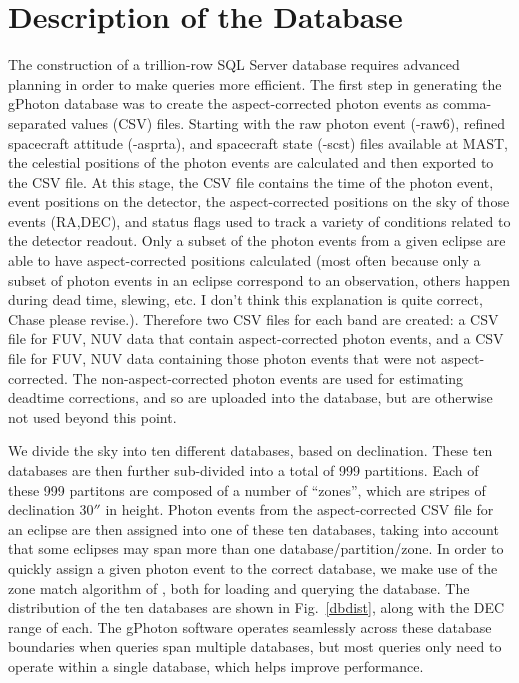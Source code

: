 \documentclass[preprint]{aastex}
\begin{document}
\section{Description of the Database}
\label{database}
The construction of a trillion-row SQL Server database requires advanced planning in order to make queries more efficient.  The first step in generating the gPhoton database was to create the aspect-corrected photon events as comma-separated values (CSV) files.  Starting with the raw photon event (-raw6), refined spacecraft attitude (-asprta), and spacecraft state (-scst) files available at MAST, the celestial positions of the photon events are calculated and then exported to the CSV file.  At this stage, the CSV file contains the time of the photon event, event positions on the detector, the aspect-corrected positions on the sky of those events (RA,DEC), and status flags used to track a variety of conditions related to the detector readout.  Only a subset of the photon events from a given eclipse are able to have aspect-corrected positions calculated (most often because only a subset of photon events in an eclipse correspond to an observation, others happen during dead time, slewing, etc. {\color{red}I don't think this explanation is quite correct, Chase please revise.}).  Therefore two CSV files for each band are created: a CSV file for {FUV, NUV} data that contain aspect-corrected photon events, and a CSV file for {FUV, NUV} data containing those photon events that were not aspect-corrected.  The non-aspect-corrected photon events are used for estimating deadtime corrections, and so are uploaded into the database, but are otherwise not used beyond this point.

We divide the sky into ten different databases, based on declination.  These ten databases are then further sub-divided into a total of 999 partitions.  Each of these 999 partitons are composed of a number of ``zones'', which are stripes of declination $30''$ in height.  Photon events from the aspect-corrected CSV file for an eclipse are then assigned into one of these ten databases, taking into account that some eclipses may span more than one database/partition/zone.  In order to quickly assign a given photon event to the correct database, we make use of the zone match algorithm of \citet{gra2006}, both for loading and querying the database.  The distribution of the ten databases are shown in Fig.\ \ref{dbdist}, along with the DEC range of each.  The gPhoton software operates seamlessly across these database boundaries when queries span multiple databases, but most queries only need to operate within a single database, which helps improve performance.
\end{document}
